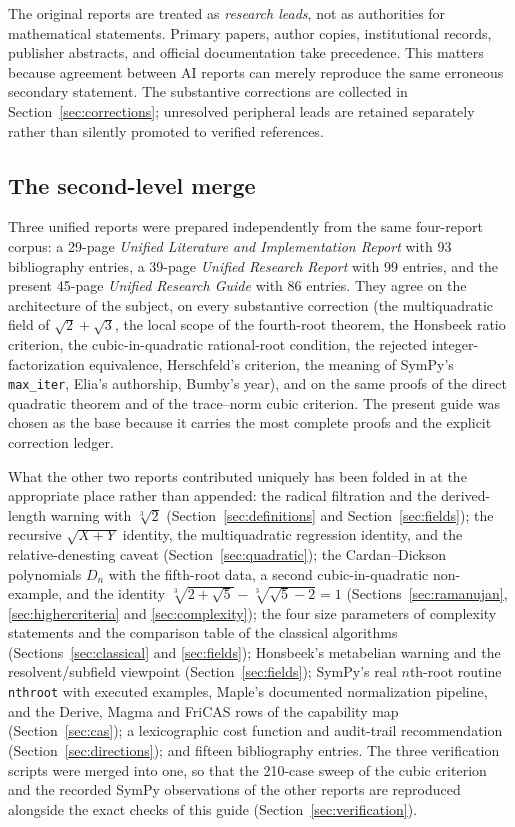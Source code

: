 \documentclass[11pt,oneside]{article}
\numberwithin{equation}{section}
\theoremstyle{definition}
\theoremstyle{remark}
\begin{document}
The original reports are treated as \emph{research leads}, not as authorities for mathematical statements. Primary papers, author copies, institutional records, publisher abstracts, and official documentation take precedence. This matters because agreement between AI reports can merely reproduce the same erroneous secondary statement. The substantive corrections are collected in Section~\ref{sec:corrections}; unresolved peripheral leads are retained separately rather than silently promoted to verified references.

\subsection{The second-level merge}
Three unified reports were prepared independently from the same four-report corpus: a 29-page \emph{Unified Literature and Implementation Report} with 93 bibliography entries, a 39-page \emph{Unified Research Report} with 99 entries, and the present 45-page \emph{Unified Research Guide} with 86 entries. They agree on the architecture of the subject, on every substantive correction (the multiquadratic field of $\sqrt2+\sqrt3$, the local scope of the fourth-root theorem, the Honsbeek ratio criterion, the cubic-in-quadratic rational-root condition, the rejected integer-factorization equivalence, Herschfeld's criterion, the meaning of SymPy's \texttt{max\_iter}, Elia's authorship, Bumby's year), and on the same proofs of the direct quadratic theorem and of the trace--norm cubic criterion. The present guide was chosen as the base because it carries the most complete proofs and the explicit correction ledger.

What the other two reports contributed uniquely has been folded in at the appropriate place rather than appended: the radical filtration and the derived-length warning with $\sqrt[3]2$ (Section~\ref{sec:definitions} and Section~\ref{sec:fields}); the recursive $\sqrt{X+Y}$ identity, the multiquadratic regression identity, and the relative-denesting caveat (Section~\ref{sec:quadratic}); the Cardan--Dickson polynomials $D_n$ with the fifth-root data, a second cubic-in-quadratic non-example, and the identity $\sqrt[3]{2+\sqrt5}-\sqrt[3]{\sqrt5-2}=1$ (Sections~\ref{sec:ramanujan}, \ref{sec:highercriteria} and \ref{sec:complexity}); the four size parameters of complexity statements and the comparison table of the classical algorithms (Sections~\ref{sec:classical} and \ref{sec:fields}); Honsbeek's metabelian warning and the resolvent/subfield viewpoint (Section~\ref{sec:fields}); SymPy's real $n$th-root routine \texttt{nthroot} with executed examples, Maple's documented normalization pipeline, and the Derive, Magma and FriCAS rows of the capability map (Section~\ref{sec:cas}); a lexicographic cost function and audit-trail recommendation (Section~\ref{sec:directions}); and fifteen bibliography entries. The three verification scripts were merged into one, so that the 210-case sweep of the cubic criterion and the recorded SymPy observations of the other reports are reproduced alongside the exact checks of this guide (Section~\ref{sec:verification}).
\end{document}
